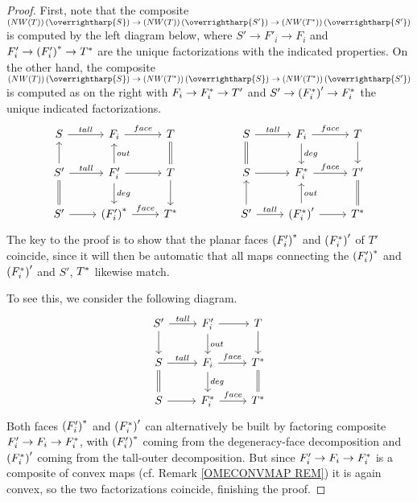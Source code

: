 \documentclass[a4paper,10pt
,draft
]{article}%
\numberwithin{equation}{section}
\numberwithin{figure}{section}
\theoremstyle{definition} %
\newcommand{\vect}[1]{\text{\overrightharp{\ensuremath{#1}}}}
\newcommand{\1}{\ensuremath{\mathbbm 1}}%
\begin{document}
\begin{proof}
First, note that the composite
$\left(NW(T)\right)(\vect{S})
\to 
\left(NW(T)\right)(\vect{S'})
\to 
\left(NW(T^{\**})\right)(\vect{S'})$
is computed by the left diagram below,
where
$S' \to F'_i \to F_i$
and 
$F'_i \to \left(F_i'\right)^{\**} \to T^{\**}$
are the unique factorizations with the indicated properties.
On the other hand, the composite
$\left(NW(T)\right)(\vect{S})
\to 
\left(NW(T^{\**})\right)(\vect{S})
\to 
\left(NW(T^{\**})\right)(\vect{S'})$
is computed as on the right
with 
$F_i \to F^{\**}_i \to T'$ and
$S' \to \left(F_i^{\**}\right)' \to F^{\**}_i$
the unique indicated factorizations.
\begin{equation}
\begin{tikzcd}
	S \ar{r}{tall} 
&
	F_i \ar{r}{face} 
&
	T \ar[equal]{d}
&&%
	S \ar{r}{tall} \ar[equal]{d}
&
	F_i \ar{r}{face} \ar{d}{deg} 
&
	T \ar{d}
\\
	S' \ar{u} \ar{r}{tall} \ar[equal]{d}
&
	F'_i \ar{r} \ar{u}[swap]{out} \ar{d}{deg}
&
	T \ar{d}
&&%
	S \ar{r}
&
	F^{\**}_i \ar{r}{face} 
&
	T' \ar[equal]{d}
\\
	S' \ar{r}
&
	\left(F_i'\right)^{\**} \ar{r}{face}
&
	T^{\**}
&&%
	S' \ar{r}{tall} \ar{u}
&
	\left(F_i^{\**}\right)' \ar{r} \ar{u}[swap]{out}
&
	T^{\**}
\end{tikzcd}
\end{equation}
The key to the proof is to show
that the planar faces 
$\left(F_i'\right)^{\**}$ and
$\left(F_i^{\**}\right)'$
of $T'$
coincide, since it will then be automatic that all maps connecting the
$\left(F_i'\right)^{\**}$ and
$\left(F_i^{\**}\right)'$
and $S'$, $T^{\**}$
likewise match.

To see this, we consider the following diagram.
\begin{equation}
\begin{tikzcd}
	S' \ar{r}{tall} \ar{d}
&
	F'_i \ar{r} \ar{d}{out}
&
	T \ar{d}
\\
	S  \ar{r}{tall} \ar[equal]{d}
&
	F_i \ar{r}{face}  \ar{d}{deg}
&
	T^{\**} \ar[equal]{d}
\\
	S \ar{r}
&
	F_i^{\**} \ar{r}{face}
&
	T^{\**}
\end{tikzcd}
\end{equation}
Both faces  
$\left(F'_i\right)^{\**}$ and 
$\left(F^{\**}_i\right)'
$
can alternatively be built by factoring
composite 
$F'_i \to F_i \to F_i^{\**}$,
with 
$\left(F'_i\right)^{\**}$ 
coming from the 
degeneracy-face decomposition
and 
$\left(F^{\**}_i\right)'
$
coming from the 
tall-outer decomposition.
But since 
$F'_i \to F_i \to F_i^{\**}$
is a composite of convex maps 
(cf. Remark \ref{OMECONVMAP REM})
it is again convex, 
so the two factorizations coincide, 
finishing the proof.
\end{proof}
\end{document}
